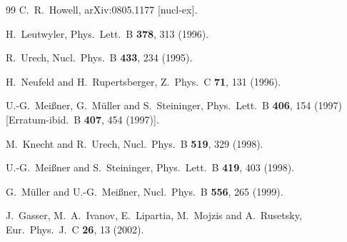 \documentclass[aps,rmp,nofootinbib,twocolumn,floatfix]{revtex4}
\begin{document}
\begin{thebibliography}{99}
  C.~R.~Howell,
  arXiv:0805.1177 [nucl-ex].

  H.~Leutwyler,
  Phys.\ Lett.\  B {\bf 378}, 313 (1996).


  R.~Urech,
  Nucl.\ Phys.\  B {\bf 433}, 234 (1995).

  H.~Neufeld and H.~Rupertsberger,
  Z.\ Phys.\  C {\bf 71}, 131 (1996).

  U.-G.~Mei\ss ner, G.~M\"uller and S.~Steininger,
  Phys.\ Lett.\  B {\bf 406}, 154 (1997)
  [Erratum-ibid.\  B {\bf 407}, 454 (1997)].

  M.~Knecht and R.~Urech,
  Nucl.\ Phys.\  B {\bf 519}, 329 (1998).

  U.-G.~Mei\ss ner and S.~Steininger,
  Phys.\ Lett.\  B {\bf 419}, 403 (1998).

  G.~M\"uller and U.-G.~Mei\ss ner,
  Nucl.\ Phys.\  B {\bf 556}, 265 (1999).

  J.~Gasser, M.~A.~Ivanov, E.~Lipartia, M.~Mojzis and A.~Rusetsky,
  Eur.\ Phys.\ J.\  C {\bf 26}, 13 (2002).


\end{thebibliography}
\end{document}
